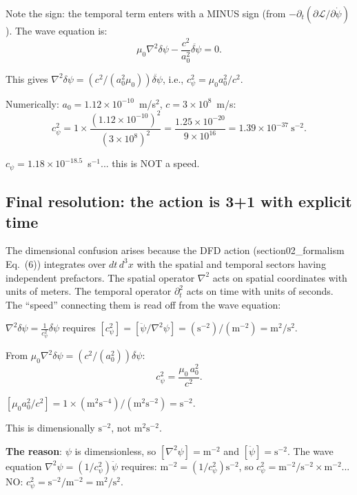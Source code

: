 \documentclass[11pt]{article}
\newcommand{\ee}[1]{\times 10^{#1}}
\begin{document}
Note the sign: the temporal term enters with a MINUS sign (from
$-\partial_t(\partial\mathcal{L}/\partial\dot\psi)$). The wave equation
is:
\begin{equation}
\mu_0\nabla^2\delta\psi - \frac{c^2}{a_0^2}\ddot{\delta\psi} = 0.
\end{equation}

This gives $\nabla^2\delta\psi = (c^2/(a_0^2\mu_0))\ddot{\delta\psi}$,
i.e., $c_\psi^2 = \mu_0 a_0^2/c^2$.

Numerically: $a_0 = 1.12\ee{-10}$~m/s$^2$, $c = 3\ee{8}$~m/s:
\begin{equation}
c_\psi^2 = 1 \times \frac{(1.12\ee{-10})^2}{(3\ee{8})^2}
= \frac{1.25\ee{-20}}{9\ee{16}} = 1.39\ee{-37}~\text{s}^{-2}.
\end{equation}

$c_\psi = 1.18\ee{-18.5}$~s$^{-1}$... this is NOT a speed.

\subsection{Final resolution: the action is 3+1 with explicit time}

The dimensional confusion arises because the DFD action
(section02\_formalism Eq.~(6)) integrates over $dt\,d^3x$ with the
spatial and temporal sectors having independent prefactors. The spatial
operator $\nabla^2$ acts on spatial coordinates with units of meters.
The temporal operator $\partial_t^2$ acts on time with units of seconds.
The ``speed'' connecting them is read off from the wave equation:

$\nabla^2\delta\psi = \frac{1}{c_\psi^2}\ddot{\delta\psi}$ requires
$[c_\psi^2] = [\ddot\psi/\nabla^2\psi] = (\text{s}^{-2})/(\text{m}^{-2})
= \text{m}^2/\text{s}^2$. \checkmark

From $\mu_0\nabla^2\delta\psi = (c^2/(a_0^2))\ddot{\delta\psi}$:
\begin{equation}
c_\psi^2 = \frac{\mu_0\,a_0^2}{c^2}.
\end{equation}

$[\mu_0 a_0^2/c^2] = 1 \times (\text{m}^2\text{s}^{-4})/(\text{m}^2\text{s}^{-2})
= \text{s}^{-2}$.

This is dimensionally $\text{s}^{-2}$, not $\text{m}^2\text{s}^{-2}$.

\textbf{The reason}: $\psi$ is dimensionless, so $[\nabla^2\psi] =
\text{m}^{-2}$ and $[\ddot\psi] = \text{s}^{-2}$. The wave equation
$\nabla^2\psi = (1/c_\psi^2)\ddot\psi$ requires:
$\text{m}^{-2} = (1/c_\psi^2)\text{s}^{-2}$, so
$c_\psi^2 = \text{m}^{-2}/\text{s}^{-2} \times \text{m}^{-2}$... NO:
$c_\psi^2 = \text{s}^{-2}/\text{m}^{-2} = \text{m}^2/\text{s}^2$. \checkmark
\end{document}
